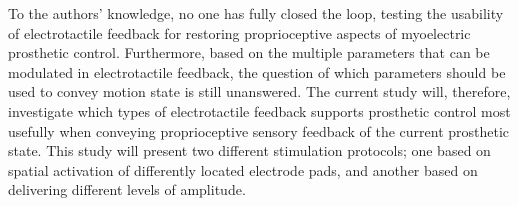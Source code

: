 %
To the authors' knowledge, no one has fully closed the loop, testing the usability of electrotactile feedback for restoring proprioceptive aspects of myoelectric prosthetic control. Furthermore, based on the multiple parameters that can be modulated in electrotactile feedback, the question of which parameters should be used to convey motion state is still unanswered. The current study will, therefore, investigate which types of electrotactile feedback supports prosthetic control most usefully when conveying proprioceptive sensory feedback of the current prosthetic state. This study will present two different stimulation protocols; one based on spatial activation of differently located electrode pads, and another based on delivering different levels of amplitude.      
















